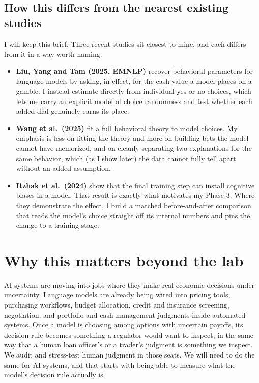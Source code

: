 \documentclass[11pt]{article}
\begin{document}
\subsection{How this differs from the nearest existing studies}

I will keep this brief. Three recent studies sit closest to mine, and each differs from it in a way
worth naming.

\begin{itemize}[leftmargin=1.4em]
\item \textbf{Liu, Yang and Tam (2025, EMNLP)} recover behavioral parameters for language models by
asking, in effect, for the cash value a model places on a gamble. I instead estimate directly from
individual yes-or-no choices, which lets me carry an explicit model of choice randomness and test
whether each added dial genuinely earns its place.
\item \textbf{Wang et al.\ (2025)} fit a full behavioral theory to model choices. My emphasis is less
on fitting the theory and more on building bets the model cannot have memorized, and on cleanly
separating two explanations for the same behavior, which (as I show later) the data cannot fully tell
apart without an added assumption.
\item \textbf{Itzhak et al.\ (2024)} show that the final training step can install cognitive biases in
a model. That result is exactly what motivates my Phase 3. Where they demonstrate the effect, I build a
matched before-and-after comparison that reads the model's choice straight off its internal numbers and
pins the change to a training stage.
\end{itemize}

\section{Why this matters beyond the lab}

AI systems are moving into jobs where they make real economic decisions under uncertainty. Language
models are already being wired into pricing tools, purchasing workflows, budget allocation, credit and
insurance screening, negotiation, and portfolio and cash-management judgments inside automated systems.
Once a model is choosing among options with uncertain payoffs, its decision rule becomes something a
regulator would want to inspect, in the same way that a human loan officer's or a trader's judgment is
something we inspect. We audit and stress-test human judgment in those seats. We will need to do the
same for AI systems, and that starts with being able to measure what the model's decision rule actually
is.
\end{document}
